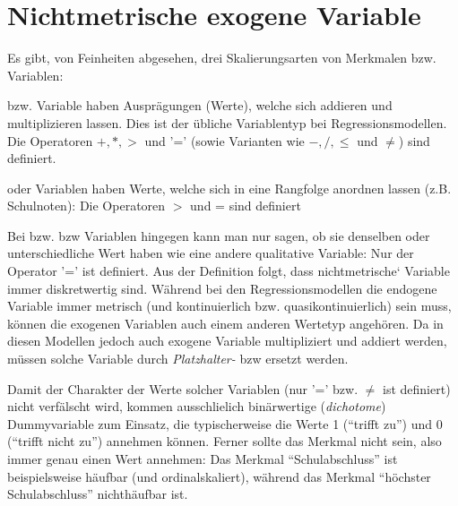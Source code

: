 \section{\label{sec:regrQualit}Nichtmetrische exogene Variable}

Es gibt, von Feinheiten abgesehen, drei Skalierungsarten von
Merkmalen bzw. Variablen:
\bi
\item 
{} bzw.  Variable haben 
 Auspr\"agungen (Werte), welche 
sich addieren und multiplizieren lassen. Dies ist der \"ubliche
Variablentyp bei Regressionsmodellen. Die Operatoren $+, *, >$ und '='
(sowie Varianten wie $-, /, \le$ und $\neq$) sind definiert.
\item {} oder 
Variablen haben Werte, welche  sich in eine Rangfolge anordnen lassen
 (z.B. Schulnoten): Die Operatoren $>$ und =  sind definiert
\item 
Bei  bzw.  bzw
 Variablen
hingegen kann man nur sagen, ob sie denselben  oder unterschiedliche
Wert haben wie eine andere qualitative Variable: Nur der Operator '='
ist definiert. Aus der Definition folgt, dass nichtmetrische` Variable immer
diskretwertig sind.
\ei
W\"ahrend bei den Regressionsmodellen die endogene Variable immer
metrisch (und kontinuierlich bzw. quasikontinuierlich) sein muss,
k\"onnen die exogenen Variablen auch einem anderen Wertetyp
angeh\"oren. Da in diesen Modellen jedoch auch exogene Variable multipliziert und
addiert werden, m\"ussen solche Variable durch \emph{Platzhalter-} bzw
  ersetzt werden. 

Damit der Charakter der Werte solcher
Variablen (nur '=' bzw. $\neq$ ist definiert) nicht verf\"alscht wird,
kommen ausschlie\3lich bin\"arwertige (\emph{dichotome}) Dummyvariable zum
Einsatz, die typischerweise die Werte 1 (``trifft zu'') und 0 (``trifft
nicht zu'') annehmen k\"onnen. Ferner sollte das Merkmal nicht
 sein, also immer genau einen Wert annehmen: Das
Merkmal ``Schulabschluss'' ist beispielsweise h\"aufbar (und ordinalskaliert),
w\"ahrend das Merkmal ``h\"ochster Schulabschluss'' 
nichth\"aufbar ist. 


